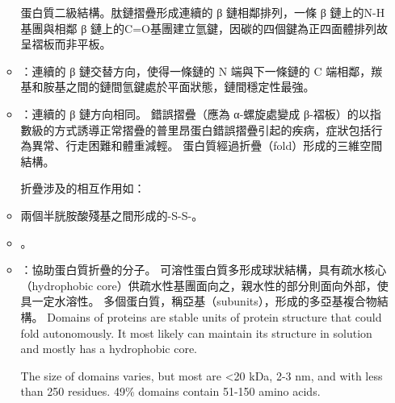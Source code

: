 \documentclass[a4paper,12pt]{report}
\begin{document}
\begin{itemize}
\begin{itemize}
\eit
\eit
{}
蛋白質二級結構。肽鏈摺疊形成連續的 β 鏈相鄰排列，一條 β 鏈上的N-H基團與相鄰 β 鏈上的C=O基團建立氫鍵，因碳的四個鍵為正四面體排列故呈褶板而非平板。
\bit
\item {}：連續的 β 鏈交替方向，使得一條鏈的 N 端與下一條鏈的 C 端相鄰，羰基和胺基之間的鏈間氫鍵處於平面狀態，鏈間穩定性最強。
\item {}：連續的 β 鏈方向相同。
\eit
{}
錯誤摺疊（應為 α-螺旋處變成 β-褶板）的以指數級的方式誘導正常摺疊的普里昂蛋白錯誤摺疊引起的疾病，症狀包括行為異常、行走困難和體重減輕。
蛋白質經過折疊（fold）形成的三維空間結構。

折疊涉及的相互作用如：
\bit
\item 兩個半胱胺酸殘基之間形成的-S-S-。
\item {}。
\item {}：協助蛋白質折疊的分子。
\eit
{}
可溶性蛋白質多形成球狀結構，具有疏水核心（hydrophobic core）供疏水性基團面向之，親水性的部分則面向外部，使具一定水溶性。
多個蛋白質，稱亞基（subunits），形成的多亞基複合物結構。
Domains of proteins are stable units of protein structure that could fold autonomously. It most likely can maintain its structure in solution and mostly has a hydrophobic core.

The size of domains varies, but most are <20 kDa, 2-3 nm, and with less than 250 residues. 49\% domains contain 51-150 amino acids.


\end{itemize}
\end{itemize}
\end{document}
